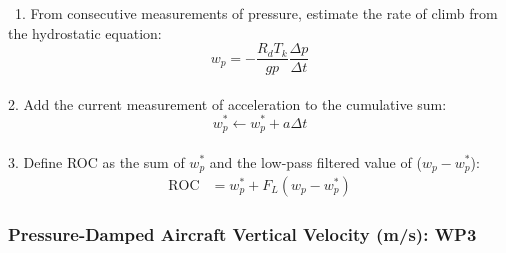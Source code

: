 \documentclass[
]{book}
\begin{document}
~1. From consecutive measurements of pressure, estimate the rate of climb
from the hydrostatic equation:\\
\begin{equation}
w_{p}=-\frac{R_{d}T_{k}}{gp}\frac{\Delta p}{\Delta t}
\label{eq:wphe}  
\end{equation}\\
\hspace*{0.333em}2. Add the current measurement of acceleration to the cumulative sum:
\begin{equation}
w_{p}^{*}\leftarrow w_{p}^{*}+a\Delta t
\label{eq:wpstar}
\end{equation}\\
\hspace*{0.333em}3. Define ROC as the sum of \(w_{p}^{*}\) and the low-pass filtered value
of (\(w_{p}-w_{p}^{*}\)):\\
\begin{align}
\mathrm{ROC} & =w_{p}^{*}+F_{L}(w_{p}-w_{p}^{*})
\label{eq:ROC}  
\end{align}

\hypertarget{wp3}{%
\subsubsection*{Pressure-Damped Aircraft Vertical Velocity (m/s): WP3}\label{wp3}}
\end{document}
